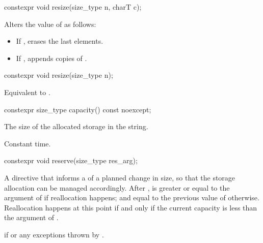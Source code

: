 %
\begin{itemdecl}
constexpr void resize(size_type n, charT c);
\end{itemdecl}

\begin{itemdescr}
\pnum
\effects
Alters the value of
as follows:
\begin{itemize}
\item
If
,
erases the last  elements.
\item
If
,
appends  copies of .
\end{itemize}
\end{itemdescr}

%
\begin{itemdecl}
constexpr void resize(size_type n);
\end{itemdecl}

\begin{itemdescr}
\pnum
\effects
Equivalent to .
\end{itemdescr}

%
\begin{itemdecl}
constexpr size_type capacity() const noexcept;
\end{itemdecl}

\begin{itemdescr}
\pnum
\returns
The size of the allocated storage in the string.

\pnum
\complexity
Constant time.
\end{itemdescr}

%
\begin{itemdecl}
constexpr void reserve(size_type res_arg);
\end{itemdecl}

\begin{itemdescr}
\pnum
\effects
A directive that informs a  of a planned change in size,
so that the storage allocation can be managed accordingly.
After
,
is greater or equal to the argument of
if reallocation happens; and
equal to the previous value of
otherwise.
Reallocation happens at this point if and only if
the current capacity is less than the argument of .

\pnum
\throws
{}
if
 or any exceptions thrown by
 .
\end{itemdescr}

